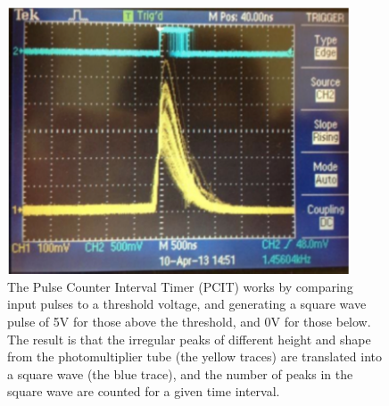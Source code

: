 \documentclass[prb,preprint]{revtex4-1}
\begin{document}
\begin{figure}[h!]
\centering
\includegraphics[width=4in]{PCITdiscriminator.pdf}
\caption{The Pulse Counter Interval Timer (PCIT) works by comparing input pulses to a threshold voltage, and generating a square wave pulse of 5V for those above the threshold, and 0V for those below. The result is that the irregular peaks of different height and shape from the photomultiplier tube (the yellow traces) are translated into a square wave (the blue trace), and the number of peaks in the square wave are counted for a given time interval. }
\label{PCITdiscriminator}
\end{figure}
\end{document}
